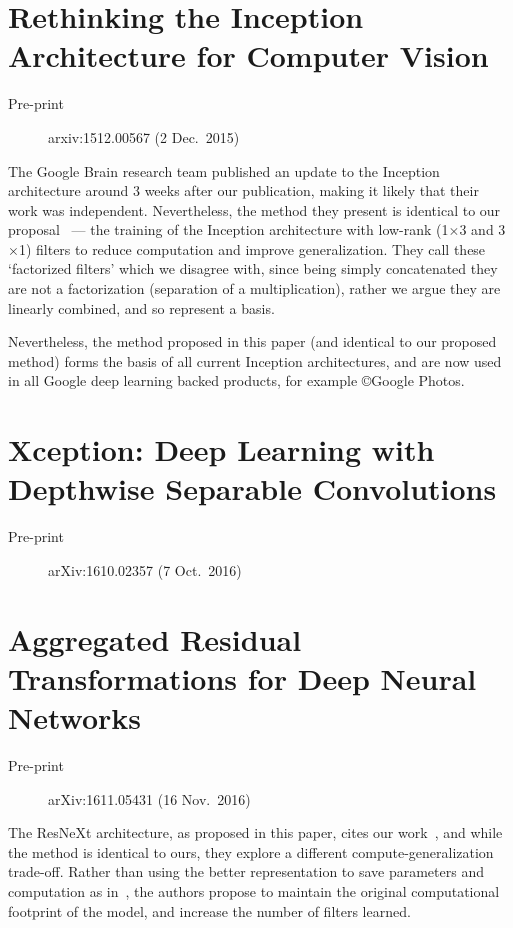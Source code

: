 \documentclass[thesis]{subfiles}
\begin{document}
\section{Rethinking the Inception Architecture for Computer Vision}
\begin{description}
    \item[Pre-print] arxiv:1512.00567 (2 Dec.\ 2015)
\end{description}
The Google Brain research team published an update to the Inception architecture around 3 weeks after our publication, making it likely that their work was independent. Nevertheless, the method they present is identical to our proposal~\citep{Ioannou2016} --- the training of the Inception architecture with low-rank (\ie{}1$\times$3 and 3$\times$1) filters to reduce computation and improve generalization. They call these `factorized filters' which we disagree with, since being simply concatenated they are not a factorization (\ie separation of a multiplication), rather we argue they are linearly combined, and so represent a basis.

Nevertheless, the method proposed in this paper (and identical to our proposed method) forms the basis of all current Inception architectures, and are now used in all Google deep learning backed products, for example \copyright{}Google Photos.

\section{Xception: Deep Learning with Depthwise Separable Convolutions}
\begin{description}
    \item[Pre-print] arXiv:1610.02357 (7 Oct.\ 2016)
\end{description}

\section{Aggregated Residual Transformations for Deep Neural Networks}
\begin{description}
    \item[Pre-print] arXiv:1611.05431 (16 Nov.\ 2016)
\end{description}
The ResNeXt architecture, as proposed in this paper, cites our work~\citep{ioannou2016e}, and while the method is identical to ours, they explore a different compute-generalization trade-off. Rather than using the better representation to save parameters and computation as in~\citep{ioannou2016e}, the authors propose to maintain the original computational footprint of the model, and increase the number of filters learned.
\end{document}
